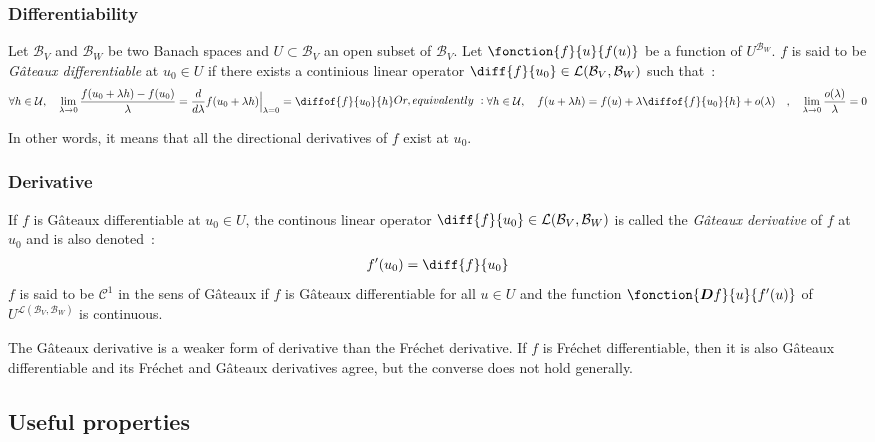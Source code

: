 \subsubsection{Differentiability}
Let $\mathcal{B}_V$ and $\mathcal{B}_W$ be two Banach spaces and $U \subset \mathcal{B}_V$ an open subset of $\mathcal{B}_V$.
Let $\fonction{f}{u}{f(u)}$ be a function of  $U^{\mathcal{B}_W}$.
$f$ is said to be \emph{Gâteaux differentiable} at $u_0\in U$ if there exists a continious linear operator $\diff{f}{u_0} \in
\mathcal{L}(\mathcal{B}_V,{\mathcal{B}_W})$ such that~:
\begin{subequations}
\begin{align}
\forall h \in \mathcal{U}, \quad\lim_{\lambda \to 0} \frac{f(u_0+\lambda h) - f(u_0)}{\lambda} = \frac{d}{d\lambda}f(u_0+\lambda h)\Bigr|_{\lambda = 0} = \diffof{f}{u_0}{h}
\end{align}
Or, equivalently~:
\begin{align}
	\forall h \in \mathcal{U}, \quad f(u+\lambda h) = f(u) + \lambda \diffof{f}{u_0}{h} + o(\lambda)
	\quad , \quad \lim_{\lambda \to 0} \frac{o(\lambda)}{\lambda} = 0
\end{align}
\end{subequations}

In other words, it means that all the directional derivatives of $f$ exist at $u_0$.

\subsubsection{Derivative}
If $f$ is Gâteaux differentiable at $u_0 \in U$, the continous linear operator $\diff{f}{u_0} \in
\mathcal{L}(\mathcal{B}_V,{\mathcal{B}_W})$ is called the \emph{Gâteaux derivative} of $f$ at $u_0$ and is also denoted~:
\begin{align}
	f'(u_0) = \diff{f}{u_0}
\end{align}
$f$ is said to be $\mathcal{C}^1$ in the sens of Gâteaux if $f$ is Gâteaux differentiable for all $u \in U$ and the function $\fonction{\boldsymbol{D}f}{u}{f'(u)}$ of $U^{\mathcal{L}(\mathcal{B}_V,{\mathcal{B}_W})}$ is continuous.

The Gâteaux derivative is a weaker form of derivative than the Fréchet derivative. If $f$ is Fréchet differentiable, then it is also Gâteaux differentiable and its Fréchet and Gâteaux derivatives agree, but the converse does not hold generally.

\subsection{Useful properties}

